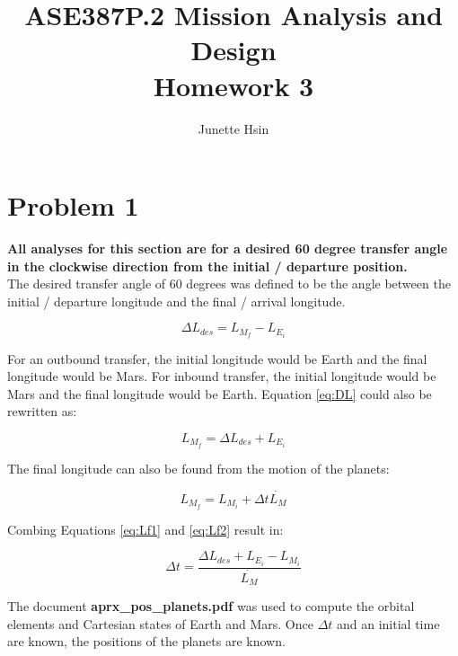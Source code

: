 \documentclass[conf]{new-aiaa}
\title{ASE387P.2 Mission Analysis and Design \\ Homework 3}
\author{Junette Hsin}
\affil{Masters Student, Aerospace Engineering and Engineering Mechanics, University of Texas, Austin, TX 78712}
\begin{document}
\maketitle




\section*{Problem 1}

\textbf{All analyses for this section are for a desired 60 degree transfer angle in the clockwise direction from the initial / departure position.} \\ 

The desired transfer angle of 60 degrees was defined to be the angle between the initial / departure longitude and the final / arrival longitude. 

\begin{equation}
    \Delta L_{des} = L_{M_f} - L_{E_i}
    \label{eq:DL}
\end{equation}

For an outbound transfer, the initial longitude would be Earth and the final longitude would be Mars. For inbound transfer, the initial longitude would be Mars and the final longitude would be Earth. Equation \ref{eq:DL} could also be rewritten as: 

\begin{equation}
    L_{M_f} = \Delta L_{des} + L_{E_i}
    \label{eq:Lf1}
\end{equation}

The final longitude can also be found from the motion of the planets: 

\begin{equation}
    L_{M_f} = L_{M_i} + \Delta t \dot{L_{M}}
    \label{eq:Lf2}
\end{equation}

Combing Equations \ref{eq:Lf1} and \ref{eq:Lf2} result in: 

\begin{equation}
    \Delta t = \frac{\Delta L_{des} + L_{E_i} - L_{M_i}}{ \dot{L_M} }
\end{equation}

The document \textbf{aprx\_pos\_planets.pdf} was used to compute the orbital elements and Cartesian states of Earth and Mars. Once $\Delta t$ and an initial time are known, the positions of the planets are known. 
\end{document}
